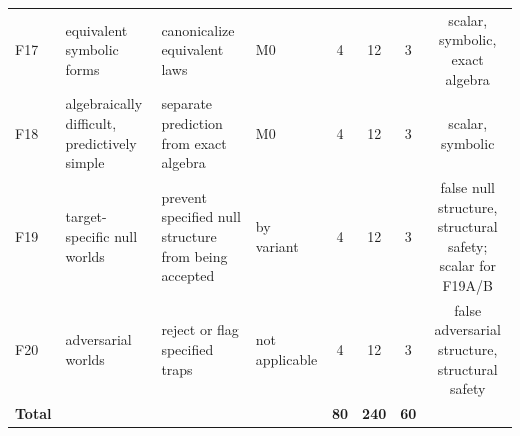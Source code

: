 \begin{table}[t]
\begin{tabular}{llllcccc}
F17 & equivalent symbolic forms & canonicalize equivalent laws & M0 & 4 & 12 & 3 & scalar, symbolic, exact algebra \\
F18 & algebraically difficult, predictively simple & separate prediction from exact algebra & M0 & 4 & 12 & 3 & scalar, symbolic \\
F19 & target-specific null worlds & prevent specified null structure from being accepted & by variant & 4 & 12 & 3 & false null structure, structural safety; scalar for F19A/B \\
F20 & adversarial worlds & reject or flag specified traps & not applicable & 4 & 12 & 3 & false adversarial structure, structural safety \\
\midrule
\textbf{Total} & & & & \textbf{80} & \textbf{240} & \textbf{60} & \\
\bottomrule
\end{tabular}
\end{table}
